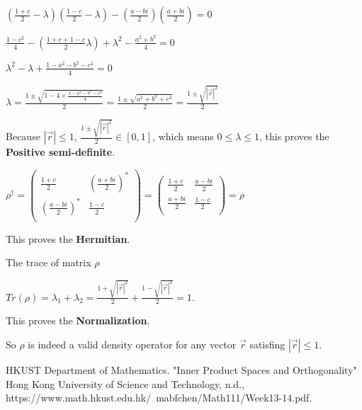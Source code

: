 \documentclass{article}
\begin{document}
\begin{enumerate}
          $(\frac{1+c}{2}-\lambda )(\frac{1-c}{2}-\lambda)-(\frac{a-bi}{2})(\frac{a+bi}{2})=0$

          $\frac{1-c^2}{4}-(\frac{1+c+1-c}{2}\lambda)+\lambda^2-\frac{a^2+b^2}{4}=0$

          $\lambda^2-\lambda+\frac{1-a^2-b^2-c^2}{4}=0$

          $\lambda=\frac{1\pm \sqrt{1-4\times\frac{1-a^2-b^2-c^2}{4}}}{2}=\frac{1\pm\sqrt{a^2+b^2+c^2}}{2}=\frac{1\pm\sqrt{|\vec{r}|^2}}{2}$

          Because $|\vec{r}|\leq1$, $\frac{1\pm\sqrt{|\vec{r}|^2}}{2} \in [0,1]$, which means $0\leq\lambda\leq1$, this proves the \textbf{Positive semi-definite}.

          $\rho^{\dag}=
              \left(
              \begin{array}{cc}
                      \frac{1+c}{2} & (\frac{a+bi}{2})^* \\(\frac{a-bi}{2})^*&\frac{1-c}{2}\\
                  \end{array}
              \right)
              =\left(
              \begin{array}{cc}
                      \frac{1+c}{2} & \frac{a-bi}{2} \\\frac{a+bi}{2}&\frac{1-c}{2}\\
                  \end{array}
              \right)=\rho$

          This proves the \textbf{Hermitian}.

          The trace of matrix $\rho$

          $Tr(\rho)=\lambda_1+\lambda_2=\frac{1+\sqrt{|\vec{r}|^2}}{2}+\frac{1-\sqrt{|\vec{r}|^2}}{2}=1$.

          This proves the \textbf{Normalization}.



          So $\rho$ is indeed a valid density operator for any vector $\vec{r}$ satisfing $|\vec{r}|\leq1$.
\end{enumerate}
\begin{thebibliography}{1}
    HKUST Department of Mathematics.
    "Inner Product Spaces and Orthogonality"
    Hong Kong University of Science and Technology, n.d.,
    https://www.math.hkust.edu.hk/~mabfchen/Math111/Week13-14.pdf.
\end{thebibliography}
\end{document}
